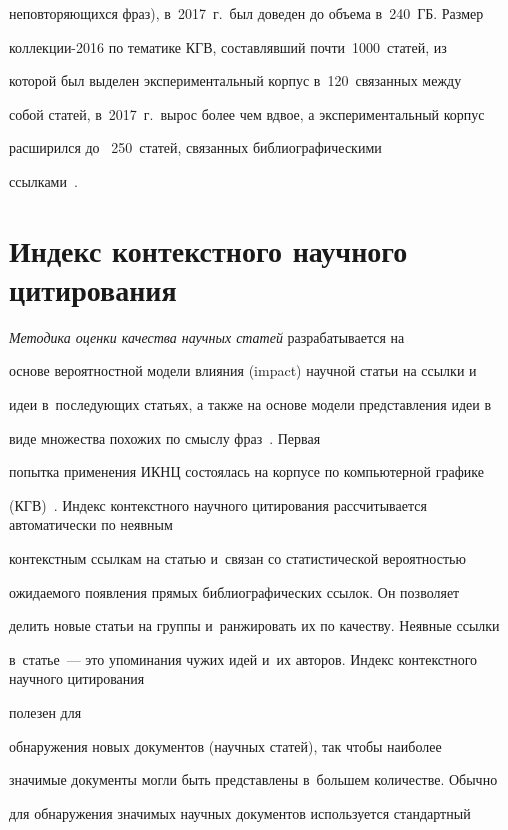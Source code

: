 неповторяющихся фраз), в~2017~г.\ был доведен до объема в~240~ГБ. Размер  


кол\-лек\-ции-2016 по тематике КГВ, со\-став\-ляв\-ший почти~1000~статей, из 


которой был выделен экспериментальный корпус в~120~связанных между 


собой статей, в~2017~г.\ вырос более чем вдвое, а экспериментальный корпус 


расширился до~ 250~статей, связанных библиографическими  


ссылками~\cite{3-gal}.





\section{Индекс контекстного научного цитирования}





  \textit{Методика оценки качества научных статей} разрабатывается на 


основе вероятностной модели влияния (impact) научной статьи на ссылки и~


идеи в~последующих статьях, а также на основе модели представления идеи в~


виде множества похожих по смыслу фраз~\cite{1-gal, 2-gal, 3-gal}. Первая 


попытка применения ИКНЦ состоялась на корпусе по компьютерной графике 


(КГВ)~\cite{2-gal}. Индекс контекстного научного цитирования рассчитывается автоматически по неявным 


контекстным ссылкам на статью и~связан со статистической вероятностью 


ожидаемого появления прямых библиографических ссылок. Он позволяет 


делить новые статьи на группы и~ранжировать их по качеству. Неявные ссылки 


в~статье~--- это упоминания чужих идей и~их авторов. Индекс контекстного научного цитирования


полезен для 


обнаружения новых документов (научных статей), так чтобы наиболее 


значимые документы могли быть представлены в~большем количестве. Обычно 


для обнаружения значимых научных документов используется стандартный 


